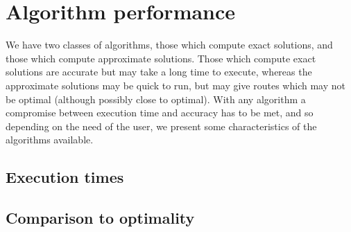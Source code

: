 \section{Algorithm performance}
\label{sec:algorithm_performance}

We have two classes of algorithms, those which compute exact solutions, and those which compute approximate solutions. Those which compute exact solutions are accurate but may take a long time to execute, whereas the approximate solutions may be quick to run, but may give routes which may not be optimal (although possibly close to optimal). With any algorithm a compromise between execution time and accuracy has to be met, and so  depending on the need of the user, we present some characteristics of the algorithms available.

\subsection{Execution times}
\label{subsec:execution_times}


\subsection{Comparison to optimality}
\label{subsec:comparison_to_optimality}

\clearpage